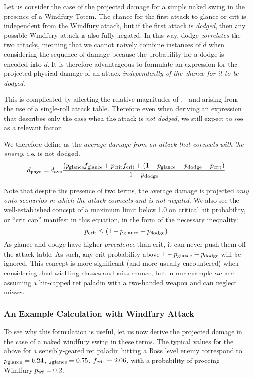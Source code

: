 Let us consider the case of the projected damage for a simple naked swing in the presence of a Windfury Totem.
The chance for the first attack to glance or crit is independent from the Windfury attack, but if the first attack is \emph{dodged}, then any possible Windfury attack is also fully negated.
In this way, dodge \emph{correlates} the two attacks, meaning that we cannot naively combine instances of $d$ when considering the sequence of damage because the probability for a dodge is encoded into $d$.
It is therefore advantageous to formulate an expression for the projected physical damage of an attack \emph{independently of the chance for it to be dodged}.

This is complicated by \pdodge affecting the relative magnitudes of \phit, \pglance, and \pcrit arising from the use of a single-roll attack table.
Therefore even when deriving an expression that describes only the case when the attack is \emph{not dodged}, we still expect to see \pdodge as a relevant factor.

We therefore define \dphys as the \emph{average damage from an attack that connects with the enemy}, i.e. is not dodged.
\begin{equation}
	d_{\mathrm{phys}}  = d_{\mathrm{ave}}  \frac{(p_{\mathrm{glance}}  f_{\mathrm{glance}}  + p_{\mathrm{crit}}  f_{\mathrm{crit}}  + (1 - p_{\mathrm{glance}}  - p_{\mathrm{dodge}}  - p_{\mathrm{crit}} )}{1 - p_{\mathrm{dodge}} }
\end{equation}

Note that despite the presence of two \pdodge terms, the average damage is projected \emph{only onto scenarios in which the attack connects and is not negated}.
We also see the well-established concept of a maximum limit below 1.0 on critical hit probability, or ``crit cap'' manifest in this equation, in the form of the necessary inequality:
\begin{equation}
	p_{\mathrm{crit}}  \leq (1-p_{\mathrm{glance}}  - p_{\mathrm{dodge}} )
\end{equation}
As glance and dodge have higher \emph{precedence} than crit, it can never push them off the attack table.
As such, any crit probability above $1 - p_{\mathrm{glance}}  - p_{\mathrm{dodge}} $ will be ignored.
This concept is more significant (and more usually encountered) when considering dual-wielding classes and miss chance, but in our example we are assuming a hit-capped ret paladin with a two-handed weapon and can neglect misses.

\subsubsection{An Example Calculation with Windfury Attack}
To see why this formulation is useful, let us now derive the projected damage in the case of a naked windfury swing in these terms.
The typical values for the above for a sensibly-geared ret paladin hitting a Boss level enemy correspond to $p_{\mathrm{glance}}  = 0.24$, $f_{\mathrm{glance}}  = 0.75$, $f_{\mathrm{crit}}  = 2.06$, with a probability of proccing Windfury $p_{\mathrm{wf}}  = 0.2$.

